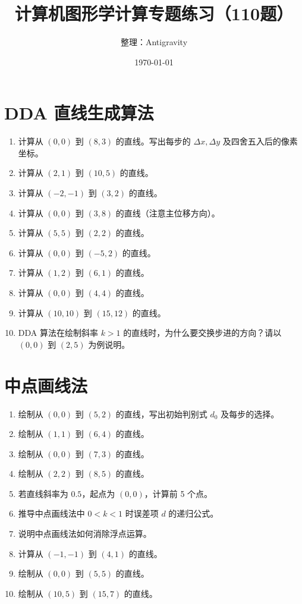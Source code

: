 \documentclass[UTF8]{ctexart}
\title{计算机图形学计算专题练习（110题）}
\author{整理：Antigravity}
\date{\today}
\begin{document}
\maketitle

\section{DDA 直线生成算法}
\begin{enumerate}
    \item 计算从 $(0,0)$ 到 $(8,3)$ 的直线。写出每步的 $\Delta x, \Delta y$ 及四舍五入后的像素坐标。
    \item 计算从 $(2,1)$ 到 $(10,5)$ 的直线。
    \item 计算从 $(-2,-1)$ 到 $(3,2)$ 的直线。
    \item 计算从 $(0,0)$ 到 $(3,8)$ 的直线（注意主位移方向）。
    \item 计算从 $(5,5)$ 到 $(2,2)$ 的直线。
    \item 计算从 $(0,0)$ 到 $(-5,2)$ 的直线。
    \item 计算从 $(1,2)$ 到 $(6,1)$ 的直线。
    \item 计算从 $(0,0)$ 到 $(4,4)$ 的直线。
    \item 计算从 $(10,10)$ 到 $(15,12)$ 的直线。
    \item DDA 算法在绘制斜率 $k > 1$ 的直线时，为什么要交换步进的方向？请以 $(0,0)$ 到 $(2,5)$ 为例说明。
\end{enumerate}

\section{中点画线法}
\begin{enumerate}
    \item 绘制从 $(0,0)$ 到 $(5,2)$ 的直线，写出初始判别式 $d_0$ 及每步的选择。
    \item 绘制从 $(1,1)$ 到 $(6,4)$ 的直线。
    \item 绘制从 $(0,0)$ 到 $(7,3)$ 的直线。
    \item 绘制从 $(2,2)$ 到 $(8,5)$ 的直线。
    \item 若直线斜率为 $0.5$，起点为 $(0,0)$，计算前 5 个点。
    \item 推导中点画线法中 $0 < k < 1$ 时误差项 $d$ 的递归公式。
    \item 说明中点画线法如何消除浮点运算。
    \item 计算从 $(-1,-1)$ 到 $(4,1)$ 的直线。
    \item 绘制从 $(0,0)$ 到 $(5,5)$ 的直线。
    \item 绘制从 $(10,5)$ 到 $(15,7)$ 的直线。
\end{enumerate}
\end{document}
